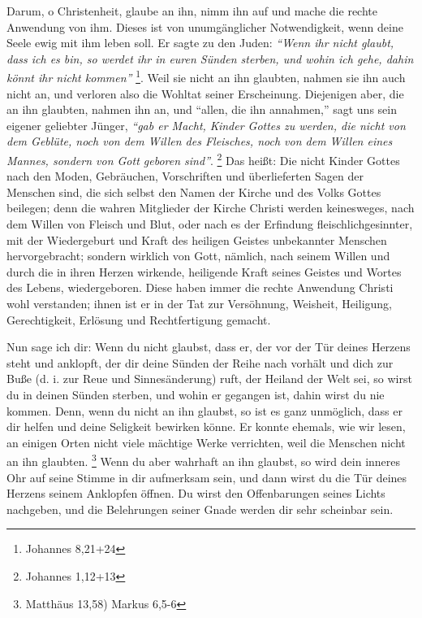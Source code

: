 Darum, o Christenheit, glaube an ihn, nimm ihn auf und mache die rechte
Anwendung von ihm. Dieses ist von unumgänglicher Notwendigkeit, wenn deine
Seele ewig mit ihm leben soll.
Er sagte zu den Juden:
\textit{"`Wenn ihr nicht glaubt, dass ich es bin, so werdet ihr in euren Sünden
sterben, und wohin ich gehe, dahin könnt ihr nicht kommen"'}
\footnote{Johannes 8,21+24}.
 Weil sie nicht an ihn 
glaubten, nahmen sie ihn auch nicht an, und verloren also die Wohltat seiner
Erscheinung. Diejenigen aber, die an ihn glaubten, nahmen ihn an, und "`allen,
die ihn annahmen,"' sagt uns sein eigener geliebter Jünger,
\textit{"`gab er Macht, Kinder Gottes zu werden, die nicht von dem Geblüte, noch
von dem Willen des Fleisches, noch von dem Willen eines Mannes, sondern von Gott
geboren sind"'}.
\footnote{Johannes 1,12+13}
Das heißt: Die nicht Kinder Gottes nach den
Moden, Gebräuchen, Vorschriften und überlieferten Sagen der Menschen sind, die
sich selbst den Namen der Kirche und des Volks Gottes beilegen; denn die wahren
Mitglieder der Kirche Christi werden keinesweges, nach dem Willen von Fleisch
und Blut, oder nach es der Erfindung fleischlichgesinnter, mit der Wiedergeburt
und Kraft des heiligen Geistes unbekannter Menschen hervorgebracht; sondern
wirklich von Gott, nämlich, nach seinem Willen und durch die in ihren Herzen
wirkende, heiligende Kraft seines Geistes und Wortes des Lebens, wiedergeboren.
Diese haben immer die rechte Anwendung Christi wohl verstanden; ihnen ist er in
der Tat zur Versöhnung, Weisheit, Heiligung, Gerechtigkeit, Erlösung und
Rechtfertigung gemacht.

Nun sage ich dir: Wenn du nicht glaubst, dass er, der vor der Tür deines Herzens
steht und anklopft, der dir deine Sünden der Reihe nach vorhält und dich zur
Buße (d. i. zur Reue und Sinnesänderung) ruft, der Heiland der Welt sei, so
wirst du in deinen Sünden sterben, und wohin er gegangen ist, dahin wirst du nie
kommen. Denn, wenn du nicht an ihn glaubst, so ist es ganz unmöglich, dass er dir
helfen und deine Seligkeit bewirken könne. Er konnte ehemals, wie wir lesen, an
einigen Orten nicht viele mächtige Werke verrichten, weil die Menschen nicht an
ihn glaubten.
\footnote{Matthäus 13,58) Markus 6,5-6}
Wenn du aber wahrhaft an ihn
glaubst, so wird dein inneres Ohr auf seine Stimme in dir aufmerksam sein, und
dann wirst du die Tür deines Herzens seinem Anklopfen öffnen. Du wirst den
Offenbarungen seines Lichts nachgeben, und die Belehrungen seiner Gnade werden
dir sehr scheinbar sein.

